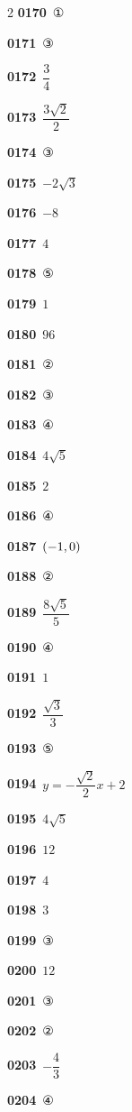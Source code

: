 \documentclass[10pt,a4paper]{article}
\begin{document}
\begin{multicols}{2}
\noindent\textbf{0170}\ ①\par
\noindent\textbf{0171}\ ③\par
\noindent\textbf{0172}\ $\dfrac{3}{4}$\par
\noindent\textbf{0173}\ $\dfrac{3\sqrt{2}}{2}$\par
\noindent\textbf{0174}\ ③\par
\noindent\textbf{0175}\ $-2\sqrt{3}$\par
\noindent\textbf{0176}\ $-8$\par
\noindent\textbf{0177}\ $4$\par
\noindent\textbf{0178}\ ⑤\par
\noindent\textbf{0179}\ $1$\par
\noindent\textbf{0180}\ $96$\par
\noindent\textbf{0181}\ ②\par
\noindent\textbf{0182}\ ③\par
\noindent\textbf{0183}\ ④\par
\noindent\textbf{0184}\ $4\sqrt{5}$\par
\noindent\textbf{0185}\ $2$\par
\noindent\textbf{0186}\ ④\par
\noindent\textbf{0187}\ $(-1{,}\mkern3mu\mathopen{}0)$\par
\noindent\textbf{0188}\ ②\par
\noindent\textbf{0189}\ $\dfrac{8\sqrt{5}}{5}$\par
\noindent\textbf{0190}\ ④\par
\noindent\textbf{0191}\ $1$\par
\noindent\textbf{0192}\ $\dfrac{\sqrt{3}}{3}$\par
\noindent\textbf{0193}\ ⑤\par
\noindent\textbf{0194}\ $y=-\dfrac{\sqrt{2}}{2}x+2$\par
\noindent\textbf{0195}\ $4\sqrt{5}$\par
\noindent\textbf{0196}\ $12$\par
\noindent\textbf{0197}\ $4$\par
\noindent\textbf{0198}\ $3$\par
\noindent\textbf{0199}\ ③\par
\noindent\textbf{0200}\ $12$\par
\noindent\textbf{0201}\ ③\par
\noindent\textbf{0202}\ ②\par
\noindent\textbf{0203}\ $-\dfrac{4}{3}$\par
\noindent\textbf{0204}\ ④\par

\end{multicols}
\end{document}
